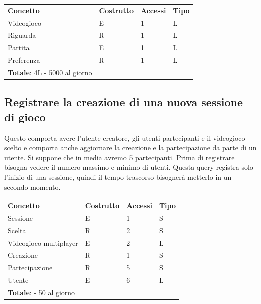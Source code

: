 \documentclass[a4paper,12pt]{report}
\begin{document}
\begin{table}[h!]
\begin{center}
	\begin{tabular}{ | m{4cm} P{4cm} P{4cm} P{4cm} | }
	\textbf{Concetto} & \textbf{Costrutto} & \textbf{Accessi} & \textbf{Tipo} \\
	Videogioco & E & 1 & L \\ \hline
	Riguarda	  & R & 1 & L \\ \hline
	Partita    & E & 1 & L \\ \hline
	Preferenza & R & 1 & L \\ \hline
	\textbf{Totale}: 4L - 5000 al giorno & & & \\
	\hline
	\end{tabular}
\end{center}
\end{table}

\newpage

\subsection*{Registrare la creazione di una nuova sessione di gioco}

Questo comporta avere l'utente creatore, gli utenti partecipanti e il videogioco scelto e comporta anche aggiornare la creazione e la partecipazione da parte di un utente. Si suppone che in media avremo 5 partecipanti.
Prima di registrare bisogna vedere il numero massimo e minimo di utenti.
Questa query registra solo l'inizio di una sessione, quindi il tempo trascorso bisognerà metterlo in un secondo momento.

\begin{table}[h!]
\begin{center}
	\begin{tabular}{ | m{4cm} P{4cm} P{4cm} P{4cm} | }
	\textbf{Concetto} & \textbf{Costrutto} & \textbf{Accessi} & \textbf{Tipo} \\
	Sessione		         & E & 1 & S \\ \hline
	Scelta		         & R & 2 & S \\ \hline
	Videogioco multiplayer & E & 2 & L \\ \hline
	Creazione              & R & 1 & S \\ \hline
	Partecipazione         & R & 5 & S \\ \hline
	Utente                 & E & 6 & L \\ \hline
	\textbf{Totale}: - 50 al giorno & & & \\
	\hline
	\end{tabular}
\end{center}
\end{table}
\end{document}
